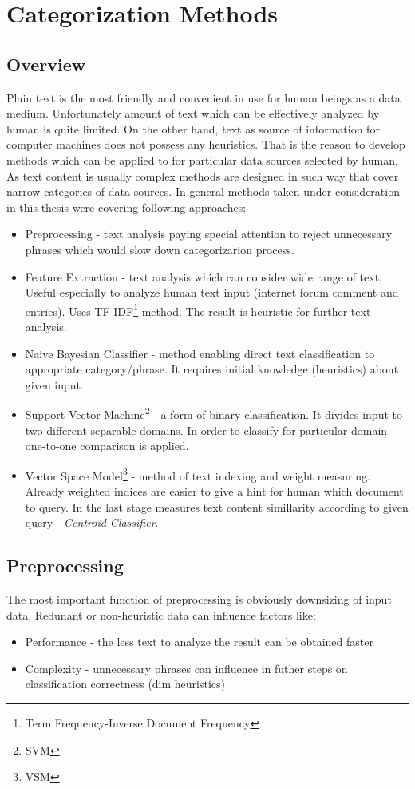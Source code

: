 \chapter{Categorization Methods}
\section{Overview}
Plain text is the most friendly and convenient in use for human beings as a data medium. Unfortunately amount of text which can be effectively analyzed by human is quite limited. On the other hand, text as source of information for computer machines does not possess any heuristics. That is the reason to develop methods which can be applied to for particular data sources selected by human. As text content is usually complex methods are designed in such way that cover narrow categories of data sources. In general methods taken under consideration in this thesis were covering following approaches:
\begin{itemize}
	\item Preprocessing - text analysis paying special attention to reject unnecessary phrases which would slow down categorizarion process.
	\item Feature Extraction - text analysis which can consider wide range of text. Useful especially to analyze human text input (internet forum comment and entries). Uses TF-IDF\footnote{Term Frequency-Inverse Document Frequency} method. The result is heuristic for further text analysis.
	\item Naive Bayesian Classifier - method enabling direct text classification to appropriate category/phrase. It requires initial knowledge (heuristics) about given input.
	\item Support Vector Machine\footnote{SVM} - a form of binary classification. It divides input to two different separable domains. In order to classify for particular domain one-to-one comparison is applied.
	\item Vector Space Model\footnote{VSM} - method of text indexing and weight measuring. Already weighted indices are easier to give a hint for human which document to query. In the last stage measures text content simillarity according to given query - \textit{Centroid Classifier}.
	       
\end{itemize}

\section{Preprocessing}
The most important function of preprocessing is obviously downsizing of input data. Redunant or non-heuristic data can influence factors like:
\begin{itemize}
	\item Performance - the less text to analyze the result can be obtained faster
	\item Complexity - unnecessary phrases can influence in futher steps on classification correctness (dim heuristics)
\end{itemize}

